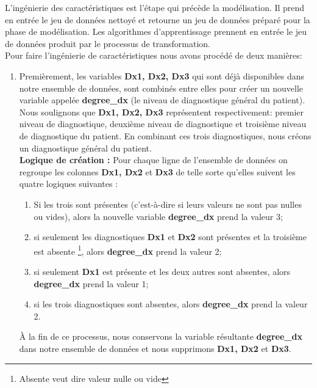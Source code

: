 \documentclass[12pt, french]{report}
\begin{document}
L'ingénierie des caractéristiques est l'étape qui précède la modélisation. Il prend en entrée le jeu de données nettoyé et retourne un jeu de données préparé pour la phase de modélisation. Les algorithmes d'apprentissage prennent en entrée le jeu de données produit par le processus de transformation. \\ 

Pour faire l'ingénierie de caractéristiques nous avons procédé de deux manières: 
\begin{enumerate}[label=\Roman*.]
\item Premièrement, les variables \textbf{Dx1, Dx2, Dx3 } qui sont déjà disponibles dans notre ensemble de données, sont combinés entre elles pour créer un nouvelle variable appelée \textbf{degree\_dx} (le niveau de diagnostique général du patient). Nous soulignons que  \textbf{Dx1, Dx2, Dx3} représentent respectivement: premier niveau de diagnostique, deuxième niveau de diagnostique et troisième niveau de diagnostique du patient. En combinant ces trois diagnostiques, nous créons un diagnostique général du patient. \\
\textbf{Logique de création : } Pour chaque ligne de l'ensemble de données on regroupe les colonnes \textbf{Dx1, Dx2} et \textbf{Dx3} de telle sorte qu'elles suivent les quatre logiques suivantes :
\begin{enumerate}
	\item Si les trois sont présentes (c'est-à-dire si leurs valeurs ne sont pas nulles ou vides), alors la nouvelle variable \textbf{degree\_dx} prend la valeur 3;
	\item  si seulement les diagnostiques \textbf{Dx1} et \textbf{Dx2} sont présentes et la troisième est absente \footnote{Absente veut dire valeur nulle ou vide}, alors \textbf{degree\_dx} prend la valeur 2;
	\item  si seulement \textbf{Dx1} est présente et les deux autres sont absentes, alors \textbf{degree\_dx} prend la valeur 1; 
	\item  si les trois diagnostiques sont absentes, alors \textbf{degree\_dx} prend la valeur 2.
\end{enumerate}
 À la fin de ce processus, nous conservons la variable résultante \textbf{degree\_dx} dans notre ensemble de données et nous supprimons \textbf{Dx1, Dx2} et \textbf{Dx3}.
  

\end{enumerate}
\end{document}
